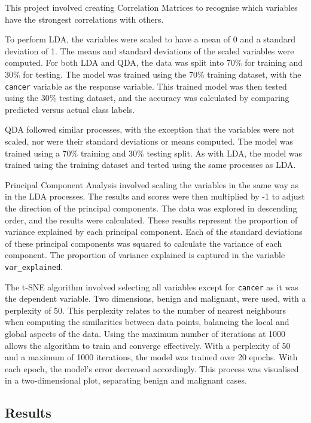\documentclass[
]{article}
\begin{document}
This project involved creating Correlation Matrices to recognise which
variables have the strongest correlations with others.

To perform LDA, the variables were scaled to have a mean of 0 and a
standard deviation of 1. The means and standard deviations of the scaled
variables were computed. For both LDA and QDA, the data was split into
70\% for training and 30\% for testing. The model was trained using the
70\% training dataset, with the \texttt{cancer} variable as the response
variable. This trained model was then tested using the 30\% testing
dataset, and the accuracy was calculated by comparing predicted versus
actual class labels.

QDA followed similar processes, with the exception that the variables
were not scaled, nor were their standard deviations or means computed.
The model was trained using a 70\% training and 30\% testing split. As
with LDA, the model was trained using the training dataset and tested
using the same processes as LDA.

Principal Component Analysis involved scaling the variables in the same
way as in the LDA processes. The results and scores were then multiplied
by -1 to adjust the direction of the principal components. The data was
explored in descending order, and the results were calculated. These
results represent the proportion of variance explained by each principal
component. Each of the standard deviations of these principal components
was squared to calculate the variance of each component. The proportion
of variance explained is captured in the variable
\texttt{var\_explained}.

The t-SNE algorithm involved selecting all variables except for
\texttt{cancer} as it was the dependent variable. Two dimensions, benign
and malignant, were used, with a perplexity of 50. This perplexity
relates to the number of nearest neighbours when computing the
similarities between data points, balancing the local and global aspects
of the data. Using the maximum number of iterations at 1000 allows the
algorithm to train and converge effectively. With a perplexity of 50 and
a maximum of 1000 iterations, the model was trained over 20 epochs. With
each epoch, the model's error decreased accordingly. This process was
visualised in a two-dimensional plot, separating benign and malignant
cases.

\subsection{Results}\label{results}
\end{document}
